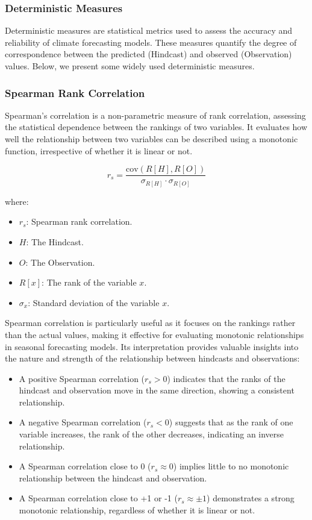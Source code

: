 \subsubsection{Deterministic Measures}

Deterministic measures are statistical metrics used to assess the accuracy and reliability of climate forecasting models. These measures quantify the degree of correspondence between the predicted (Hindcast) and observed (Observation) values. Below, we present some widely used deterministic measures.

\subsubsection{Spearman Rank Correlation}

Spearman's correlation is a non-parametric measure of rank correlation, assessing the statistical dependence between the rankings of two variables. It evaluates how well the relationship between two variables can be described using a monotonic function, irrespective of whether it is linear or not. 

\[
r_s = \frac{\text{cov}(R[H], R[O])}{\sigma_{R[H]} \cdot \sigma_{R[O]}}
\]

where:  
\begin{itemize}
    \item \( r_s \): Spearman rank correlation.  
    \item \( H \): The Hindcast.  
    \item \( O \): The Observation.  
    \item \( R[x] \): The rank of the variable \( x \).  
    \item \( \sigma_x \): Standard deviation of the variable \( x \).  
\end{itemize}


Spearman correlation is particularly useful as it focuses on the rankings rather than the actual values, making it effective for evaluating monotonic relationships in seasonal forecasting models. Its interpretation provides valuable insights into the nature and strength of the relationship between hindcasts and observations:  

\begin{itemize}
    \item A positive Spearman correlation (\( r_s > 0 \)) indicates that the ranks of the hindcast and observation move in the same direction, showing a consistent relationship.  
    \item A negative Spearman correlation (\( r_s < 0 \)) suggests that as the rank of one variable increases, the rank of the other decreases, indicating an inverse relationship.  
    \item A Spearman correlation close to 0 (\( r_s \approx 0 \)) implies little to no monotonic relationship between the hindcast and observation.  
    \item A Spearman correlation close to +1 or -1 (\( r_s \approx \pm1 \)) demonstrates a strong monotonic relationship, regardless of whether it is linear or not.  
\end{itemize}
